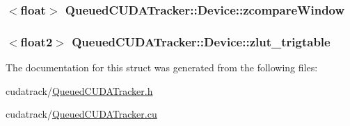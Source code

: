 \subsubsection[{\texorpdfstring{zcompare\+Window}{zcompareWindow}}]{$<$float$>$ Queued\+C\+U\+D\+A\+Tracker\+::\+Device\+::zcompare\+Window}\hypertarget{struct_queued_c_u_d_a_tracker_1_1_device_a7113ca292baf28726c03abaf93b2127d}{}\label{struct_queued_c_u_d_a_tracker_1_1_device_a7113ca292baf28726c03abaf93b2127d}
\subsubsection[{\texorpdfstring{zlut\+\_\+trigtable}{zlut_trigtable}}]{$<$float2$>$ Queued\+C\+U\+D\+A\+Tracker\+::\+Device\+::zlut\+\_\+trigtable}\hypertarget{struct_queued_c_u_d_a_tracker_1_1_device_aad5b6289612d3e8a24ed0558562a3bca}{}\label{struct_queued_c_u_d_a_tracker_1_1_device_aad5b6289612d3e8a24ed0558562a3bca}


The documentation for this struct was generated from the following files\+:\begin{DoxyCompactItemize}
\item 
cudatrack/\hyperlink{_queued_c_u_d_a_tracker_8h}{Queued\+C\+U\+D\+A\+Tracker.\+h}\item 
cudatrack/\hyperlink{_queued_c_u_d_a_tracker_8cu}{Queued\+C\+U\+D\+A\+Tracker.\+cu}\end{DoxyCompactItemize}
